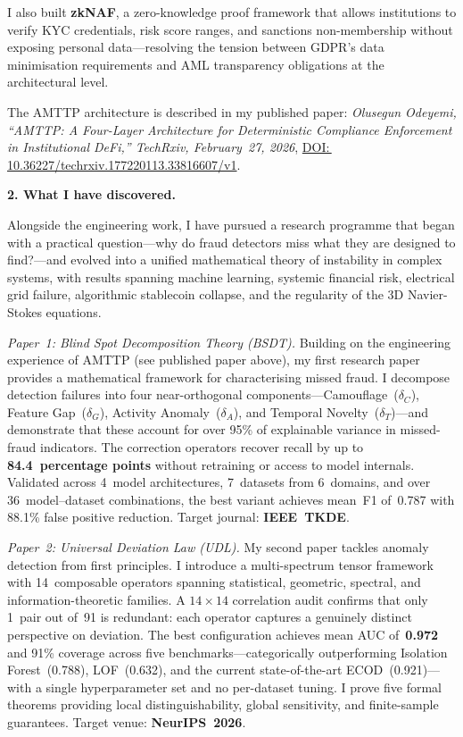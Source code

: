 \documentclass[12pt,a4paper]{article}
\begin{document}
I also built \textbf{zkNAF}, a zero-knowledge proof framework that allows
institutions to verify KYC credentials, risk score ranges, and sanctions
non-membership without exposing personal data---resolving the tension
between GDPR's data minimisation requirements and AML transparency
obligations at the architectural level.

The AMTTP architecture is described in my published paper:
\textit{Olusegun Odeyemi, ``AMTTP: A Four-Layer Architecture for
Deterministic Compliance Enforcement in Institutional DeFi,''
TechRxiv, February~27, 2026},
\href{https://doi.org/10.36227/techrxiv.177220113.33816607/v1}{DOI:\,10.36227/techrxiv.177220113.33816607/v1}.


\textbf{2. What I have discovered.}

Alongside the engineering work, I have pursued a research programme that
began with a practical question---why do fraud detectors miss what they
are designed to find?---and evolved into a unified mathematical theory of
instability in complex systems, with results spanning machine learning,
systemic financial risk, electrical grid failure, algorithmic stablecoin
collapse, and the regularity of the 3D Navier-Stokes equations.

\textit{Paper~1: Blind Spot Decomposition Theory (BSDT).}\;
Building on the engineering experience of AMTTP (see published paper
above), my first research paper provides a mathematical framework for
characterising missed fraud.  I decompose detection failures into four near-orthogonal
components---Camouflage~($\delta_C$), Feature Gap~($\delta_G$), Activity
Anomaly~($\delta_A$), and Temporal Novelty~($\delta_T$)---and demonstrate
that these account for over 95\% of explainable variance in missed-fraud
indicators.  The correction operators recover recall by up to
\textbf{84.4~percentage points} without retraining or access to model
internals.  Validated across 4~model architectures, 7~datasets from
6~domains, and over 36~model--dataset combinations, the best variant
achieves mean~F1 of~0.787 with 88.1\% false positive reduction.
Target journal: \textbf{IEEE~TKDE}.

\textit{Paper~2: Universal Deviation Law (UDL).}\;
My second paper tackles anomaly detection from first principles.
I introduce a multi-spectrum tensor framework with 14~composable
operators spanning statistical, geometric, spectral, and
information-theoretic families.  A $14\times14$ correlation audit
confirms that only 1~pair out of~91 is redundant: each operator captures
a genuinely distinct perspective on deviation.  The best configuration
achieves mean AUC of~\textbf{0.972} and 91\% coverage across five
benchmarks---categorically outperforming Isolation Forest~(0.788),
LOF~(0.632), and the current state-of-the-art ECOD~(0.921)---with a
single hyperparameter set and no per-dataset tuning.  I prove five
formal theorems providing local distinguishability, global sensitivity,
and finite-sample guarantees.
Target venue: \textbf{NeurIPS~2026}.
\end{document}
